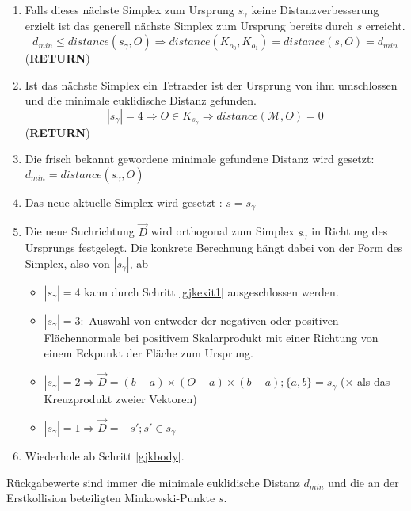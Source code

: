 \begin{enumerate}
	\item Falls dieses nächste Simplex zum Ursprung $s_{\gamma}$ keine Distanzverbesserung erzielt ist das generell nächste Simplex zum Ursprung bereits durch $s$ erreicht.
	$$d_{min} \leq distance(s_{\gamma}, O) \Rightarrow distance(K_{o_0}, K_{o_1}) = distance(s, O) = d_{min}$$ (\textbf{RETURN})
	\item \label{gjkexit1}Ist das nächste Simplex ein Tetraeder ist der Ursprung von ihm umschlossen und die minimale euklidische Distanz gefunden. 
	$$|s_{\gamma}| = 4 \Rightarrow O \in K_{s_{\gamma}} \Rightarrow distance(\mathcal{M}, O) = 0$$ (\textbf{RETURN})
	\item Die frisch bekannt gewordene minimale gefundene Distanz wird gesetzt: $d_{min} = distance(s_{\gamma}, O)$
	\item Das neue aktuelle Simplex wird gesetzt : $s = s_{\gamma}$
	\item Die neue Suchrichtung $\vec{D}$ wird orthogonal zum Simplex $s_{\gamma}$ in Richtung des Ursprungs festgelegt.
	Die konkrete Berechnung hängt dabei von der Form des Simplex, also von $|s_{\gamma}|$, ab \cite{gjk-casey}\\
	
	\begin{itemize}
		\item $|s_{\gamma}| = 4$ kann durch Schritt \ref{gjkexit1} ausgeschlossen werden.
		\item $|s_{\gamma}| = 3 :$ Auswahl von entweder der negativen oder positiven Flächennormale bei positivem Skalarprodukt mit einer Richtung von einem Eckpunkt der Fläche zum Ursprung.
		\item $|s_{\gamma}| = 2 \Rightarrow \vec{D} = (b-a)\times (O-a)\times (b-a);  \{a, b\} = s_{\gamma}$ ($\times$ als das Kreuzprodukt zweier Vektoren)
		\item $|s_{\gamma}| = 1 \Rightarrow \vec{D} = -s' ; s' \in s_{\gamma}$
	\end{itemize}
	\item \label{gjkloop} Wiederhole ab Schritt \ref{gjkbody}.
\end{enumerate}
Rückgabewerte sind immer die minimale euklidische Distanz $d_{min}$ und die an der Erstkollision beteiligten Minkowski-Punkte $s$.

